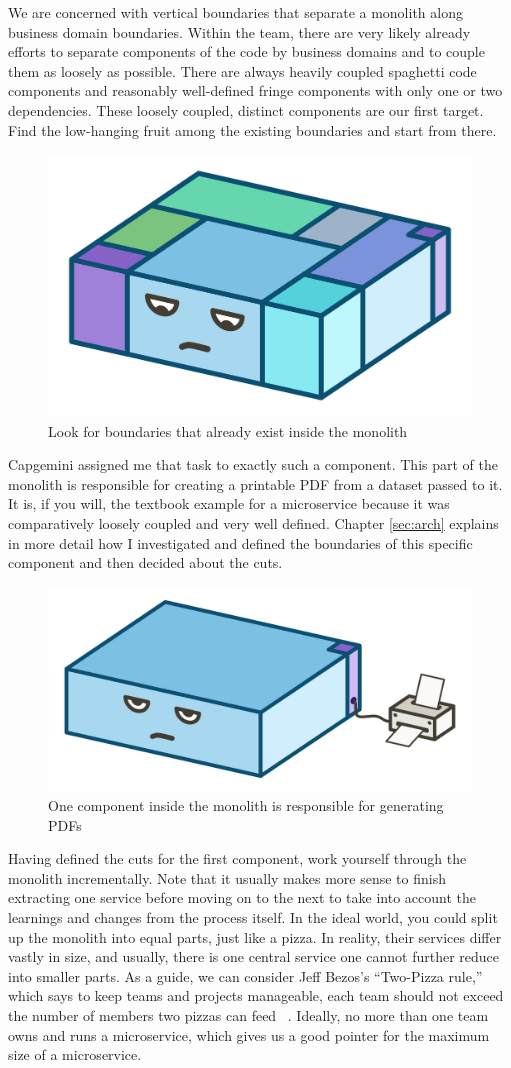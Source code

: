 We are concerned with vertical boundaries that separate a monolith along business domain boundaries. Within the team, there are very likely already efforts to separate components of the code by business domains and to couple them as loosely as possible. There are always heavily coupled spaghetti code components and reasonably well-defined fringe components with only one or two dependencies. These loosely coupled, distinct components are our first target. Find the low-hanging fruit among the existing boundaries and start from there.

\begin{figure}[ht]
  \centering
  \includegraphics[width=0.4\linewidth]{assets/illustration-monolith-boundaries.png}
  \caption{Look for boundaries that already exist inside the monolith}
\end{figure}

Capgemini assigned me that task to exactly such a component. This part of the monolith is responsible for creating a printable PDF from a dataset passed to it. It is, if you will, the textbook example for a microservice because it was comparatively loosely coupled and very well defined. Chapter \ref{sec:arch} explains in more detail how I investigated and defined the boundaries of this specific component and then decided about the cuts.

\begin{figure}[ht]
  \centering
  \includegraphics[width=0.4\linewidth]{assets/illustration-monolith-printer.png}
  \caption{One component inside the monolith is responsible for generating PDFs}
\end{figure}

Having defined the cuts for the first component, work yourself through the monolith incrementally. Note that it usually makes more sense to finish extracting one service before moving on to the next to take into account the learnings and changes from the process itself. In the ideal world, you could split up the monolith into equal parts, just like a pizza. In reality, their services differ vastly in size, and usually, there is one central service one cannot further reduce into smaller parts. As a guide, we can consider Jeff Bezos's ``Two-Pizza rule,'' which says to keep teams and projects manageable, each team should not exceed the number of members two pizzas can feed ~\cite{hern.2018}. Ideally, no more than one team owns and runs a microservice, which gives us a good pointer for the maximum size of a microservice.



